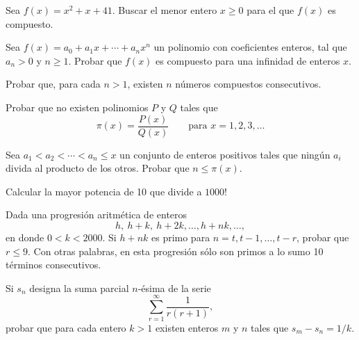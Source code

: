 \documentclass[12pt,a4paper]{book}
\begin{document}
    \begin{ejercicio}
        Sea $f(x)=x^{2}+x+41$. Buscar el menor entero $x\geq0$ para el que $f(x)$ es
        compuesto.
    \end{ejercicio}

    \begin{ejercicio}
        Sea $f(x)=a_{0}+a_{1}x+\cdots+a_{n}x^{n}$ un polinomio con coeficientes enteros, tal
        que $a_{n}>0$ y $n\geq1$. Probar que $f(x)$ es compuesto para una infinidad de
        enteros $x$.
    \end{ejercicio}

    \begin{ejercicio}
        Probar que, para cada $n>1$, existen $n$ números compuestos consecutivos.
    \end{ejercicio}

    \begin{ejercicio}
        Probar que no existen polinomios $P$ y $Q$ tales que
        \begin{equation*}
            \pi(x)=\frac{P(x)}{Q(x)}\qquad\text{para } x=1,2,3,\dots
        \end{equation*}
    \end{ejercicio}

    \begin{ejercicio}
        Sea $a_{1}<a_{2}<\cdots<a_{n}\leq x$ un conjunto de enteros positivos tales que
        ningún $a_{i}$ divida al producto de los otros. Probar que $n\leq\pi(x)$.
    \end{ejercicio}

    \begin{ejercicio}
        Calcular la mayor potencia de 10 que divide a $1000!$
    \end{ejercicio}

    \begin{ejercicio}
        Dada una progresión aritmética de enteros
        \begin{equation*}
            h,\ h+k,\ h+2k,\dots,h+nk,\dots,
        \end{equation*}
        en donde $0<k<2000$. Si $h+nk$ es primo para $n=t,t-1,\dots,t-r$, probar que
        $r\leq9$. Con otras palabras, en esta progresión sólo son primos a lo sumo 10
        términos consecutivos.
    \end{ejercicio}

    \begin{ejercicio}
        Si $s_{n}$ designa la suma parcial $n$-ésima de la serie
        \begin{equation*}
            \sum_{r=1}^{\infty}\frac{1}{r(r+1)},
        \end{equation*}
        probar que para cada entero $k>1$ existen enteros $m$ y $n$ tales que
        $s_{m}-s_{n}=1/k$.
    \end{ejercicio}
\end{document}
